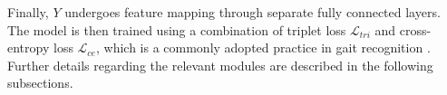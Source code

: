 \documentclass[10pt,twocolumn,letterpaper]{article}
\begin{document}




Finally, $Y$ undergoes feature mapping through separate fully connected layers. The model is then trained using a combination of triplet loss $\mathcal{L}_{tri}$ and cross-entropy loss $\mathcal{L}_{ce}$, which is a commonly adopted practice in gait recognition \cite{hou2020gait,lin2021gait,huang2021context,huang20213d,dou2022metagait}.  Further details regarding the relevant modules are described in the following subsections.


\end{document}
